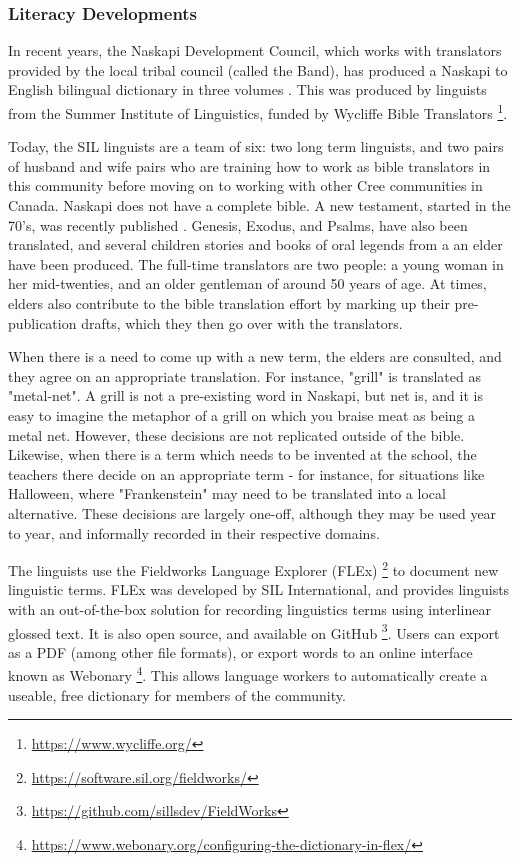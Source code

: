 \documentclass[10pt, a4paper]{article}
\begin{document}
\subsubsection{Literacy Developments}
In recent years, the Naskapi Development Council, which works with translators provided by the local tribal council (called the Band), has produced a Naskapi to English bilingual dictionary in three volumes \cite{MacKenzie-and-Jancewicz-1994}. This was produced by linguists from the Summer Institute of Linguistics, funded by Wycliffe Bible Translators \footnote{\href{https://www.wycliffe.org/}{https://www.wycliffe.org/}}.

Today, the SIL linguists are a team of six: two long term linguists, and two pairs of husband and wife pairs who are training how to work as bible translators in this community before moving on to working with other Cree communities in Canada. Naskapi does not have a complete bible. A new testament, started in the 70's, was recently published \cite{naskapi-new-testament}. Genesis, Exodus, and Psalms, have also been translated, and several children stories and books of oral legends from a an elder have been produced. The full-time translators are two people: a young woman in her mid-twenties, and an older gentleman of around 50 years of age. At times, elders also contribute to the bible translation effort by marking up their pre-publication drafts, which they then go over with the translators.

When there is a need to come up with a new term, the elders are consulted, and they agree on an appropriate translation. For instance, "grill" is translated as "metal-net". A grill is not a pre-existing word in Naskapi, but net is, and it is easy to imagine the metaphor of a grill on which you braise meat as being a metal net. However, these decisions are not replicated outside of the bible. Likewise, when there is a term which needs to be invented at the school, the teachers there decide on an appropriate term - for instance, for situations like Halloween, where "Frankenstein" may need to be translated into a local alternative. These decisions are largely one-off, although they may be used year to year, and informally recorded in their respective domains.

The linguists use the Fieldworks Language Explorer (FLEx) \footnote{\href{https://software.sil.org/fieldworks/}{https://software.sil.org/fieldworks/}} to document new linguistic terms. FLEx was developed by SIL International, and provides linguists with an out-of-the-box solution for recording linguistics terms using interlinear glossed text. It is also open source, and available on GitHub \footnote{\href{https://github.com/sillsdev/FieldWorks}{https://github.com/sillsdev/FieldWorks}}. Users can export as a PDF (among other file formats), or export words to an online interface known as Webonary \footnote{\href{https://www.webonary.org/configuring-the-dictionary-in-flex/}{https://www.webonary.org/configuring-the-dictionary-in-flex/}}.
This allows language workers to automatically create a useable, free dictionary for members of the community.
\end{document}
